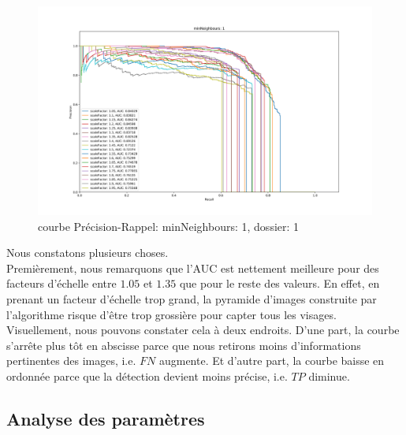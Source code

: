 \documentclass[a4paper,11pt]{article}
\begin{document}
    \label{results}
	\begin{figure}[H]
	    \begin{center}
		\includegraphics[scale = 0.4]{images/courbes/folder_01_minN_1.png}
		\caption{courbe Précision-Rappel: minNeighbours: 1, dossier: 1}
		\label{fig:minN_1}
	    \end{center}
	\end{figure}
        Nous constatons plusieurs choses.
        \\
        Premièrement, nous remarquons que l'AUC est nettement meilleure pour des facteurs d'échelle entre $1.05$ et $1.35$ que pour le reste des valeurs.
        En effet, en prenant un facteur d'échelle trop grand, la pyramide d'images construite par l'algorithme risque d'être trop grossière pour capter tous les visages.
        Visuellement, nous pouvons constater cela à deux endroits. 
        D'une part, la courbe s'arrête plus tôt en abscisse parce que nous retirons moins d'informations pertinentes des images, i.e. $FN$ augmente.
        Et d'autre part, la courbe baisse en ordonnée parce que la détection devient moins précise, i.e. $TP$ diminue.

    \subsection{Analyse des paramètres}
        
\end{document}
